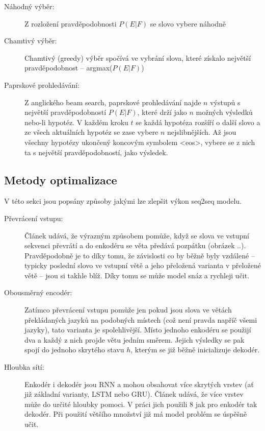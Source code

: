 \begin{description}
  \item[Náhodný výběr:] Z rozložení pravděpodobnosti $P(E|F)$ se slovo vybere náhodně
  \item[Chamtivý výběr:] Chamtivý (greedy) výběr spočívá ve vybrání slova, které získalo největší pravděpodobnost -- argmax($P(E|F)$)
  \item[Paprskové prohledávání:] Z anglického beam search, paprskové prohledávání najde $n$ výstupů s největší pravděpodobností $P(E|F)$, které drží jako $n$ možných výsledků nebo-li hypotéz. V každém kroku $t$ se každá hypotéza rozšíří o další slovo a ze všech aktuálních hypotéz se zase vybere $n$ nejslibnějších. Až jsou všechny hypotézy ukončený koncovým symbolem <eos>, vybere se z nich ta s největší pravděpodobností, jako výsledek.
\end{description}



\subsection{Metody optimalizace}
V této sekci jsou popsány způsoby jakými lze zlepšit výkon seq2seq modelu.

\begin{description}
  \item[Převrácení vstupu:] Článek \cite{seq2seq} udává, že výrazným způsobem pomůže, když se slova ve vstupní sekvenci převrátí a do enkodéru  se věta předává pozpátku (obrázek ..).  Pravděpodobně je to díky tomu, že závislosti co by běžně byly vzdálené -- typicky poslední slovo ve vstupní větě a jeho přeložená varianta v přeložené větě -- jsou si takhle blíž. Díky tomu se může model snáz a rychleji učit.
  \item[Obousměrný encodér:] Zatímco převrácení vstupu pomůže jen pokud jsou slova ve větách překládaných jazyků na podobných místech (což není pravda napříč všemi jazyky), tato varianta je spolehlivější. Místo jednoho enkodéru se použijí dva a každý z nich projde větu jedním směrem. Jejich výsledky se pak spojí do jednoho skrytého stavu $h$, kterým se již běžně inicializuje dekodér.
  \item[Hloubka sítí:] Enkodér i dekodér jsou RNN a mohou obsahovat více skrytých vrstev (ať již základní varianty, LSTM nebo GRU). Článek \cite{googleBridgingGap} udává, že více vrstev může do určité hloubky pomoci. V práci jich použili 8 jak pro enkodér tak dekodér. Při použití většího množství již má model problém se úspěšně učit.
\end{description}


